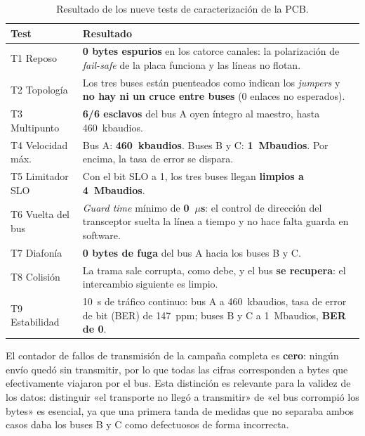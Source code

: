 \begin{table}[H]
    \centering
    \begin{tabular}{p{3.1cm} p{11.4cm}}
        \hline
        \textbf{Test} & \textbf{Resultado} \\
        \hline
        T1 Reposo & \textbf{0 bytes espurios} en los catorce canales: la polarización de \textit{fail-safe} de la placa funciona y las líneas no flotan. \\
        T2 Topología & Los tres buses están puenteados como indican los \textit{jumpers} y \textbf{no hay ni un cruce entre buses} (0 enlaces no esperados). \\
        T3 Multipunto & \textbf{6/6 esclavos} del bus A oyen íntegro al maestro, hasta 460~kbaudios. \\
        T4 Velocidad máx. & Bus A: \textbf{460~kbaudios}. Buses B y C: \textbf{1~Mbaudios}. Por encima, la tasa de error se dispara. \\
        T5 Limitador SLO & Con el bit SLO a 1, los tres buses llegan \textbf{limpios a 4~Mbaudios}. \\
        T6 Vuelta del bus & \textit{Guard time} mínimo de \textbf{0~$\mu$s}: el control de dirección del transceptor suelta la línea a tiempo y no hace falta guarda en software. \\
        T7 Diafonía & \textbf{0 bytes de fuga} del bus A hacia los buses B y C. \\
        T8 Colisión & La trama sale corrupta, como debe, y el bus \textbf{se recupera}: el intercambio siguiente es limpio. \\
        T9 Estabilidad & 10~s de tráfico continuo: bus A a 460~kbaudios, tasa de error de bit (BER) de 147~ppm; buses B y C a 1~Mbaudios, \textbf{BER de 0}. \\
        \hline
    \end{tabular}
    \caption{Resultado de los nueve tests de caracterización de la PCB.}
    \label{tab:pcb_resumen}
\end{table}

El contador de fallos de transmisión de la campaña completa es \textbf{cero}: ningún envío quedó sin
transmitir, por lo que todas las cifras corresponden a bytes que efectivamente viajaron por el bus.
Esta distinción es relevante para la validez de los datos: distinguir «el transporte no llegó a
transmitir» de «el bus corrompió los bytes» es esencial, ya que una primera tanda de medidas que no
separaba ambos casos daba los buses B y C como defectuosos de forma incorrecta.

